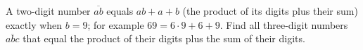 A two-digit number $\overline{ab}$ equals $ab+a+b$ (the product of its digits plus their sum) exactly when $b=9$; for example $69=6\cdot9+6+9$. Find all three-digit numbers $\overline{abc}$ that equal the product of their digits plus the sum of their digits.
